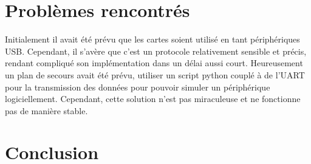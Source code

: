 \documentclass[french, 11pt]{article}
\begin{document}
	\section{Problèmes rencontrés}

	Initialement il avait été prévu que les cartes soient utilisé en tant périphériques USB. Cependant, il s'avère que c'est un protocole relativement sensible et précis, rendant compliqué son implémentation dans un délai aussi court. Heureusement un plan de secours avait été prévu, utiliser un script python couplé à de l'UART pour la transmission des données pour pouvoir simuler un périphérique logiciellement. Cependant, cette solution n'est pas miraculeuse et ne fonctionne pas de manière stable.

    \section{Conclusion}
\end{document}
